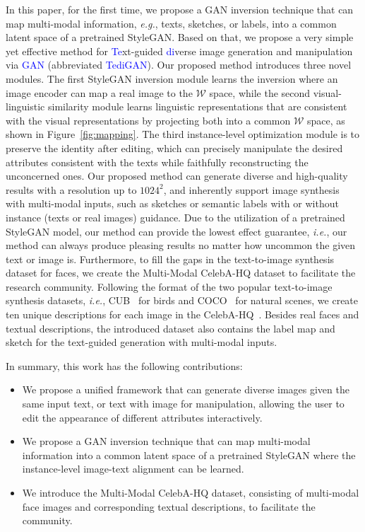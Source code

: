 \documentclass[final]{cvpr}
\newcommand{\W}{\mathcal{W}}
\def\eg{\emph{e.g.}}
\def\ie{\emph{i.e.}}
\begin{document}
In this paper, for the first time, we propose a GAN inversion technique that can map multi-modal information, \eg, texts, sketches, or labels, into a common latent space of a pretrained StyleGAN.
Based on that, we propose a very simple yet effective method for \textcolor{blue}{Te}xt-guided \textcolor{blue}{di}verse image generation and manipulation via \textcolor{blue}{GAN} (abbreviated \textcolor{blue}{TediGAN}). 
Our proposed method introduces three novel modules. The first StyleGAN inversion module learns the inversion where an image encoder can map a real image to the $\W$ space, 
while the second visual-linguistic similarity module learns linguistic representations that are consistent with the visual representations by projecting both into a common $\W$ space, as shown in Figure~\ref{fig:mapping}.
The third instance-level optimization module is to preserve the identity after editing, which can precisely manipulate the desired attributes consistent with the texts while faithfully reconstructing the unconcerned ones.
Our proposed method can generate diverse and high-quality results 
with a resolution up to $\text{1024}^2$,
and inherently support image synthesis with multi-modal inputs, such as sketches or semantic labels with or without instance (texts or real images) guidance.
Due to the utilization of a pretrained StyleGAN model, our method can provide the lowest effect guarantee, \ie, our method can always produce pleasing results no matter how uncommon the given text or image is.
Furthermore, to fill the gaps in the text-to-image synthesis dataset for faces, we create the Multi-Modal CelebA-HQ dataset to facilitate the research community.
Following the format of the two popular text-to-image synthesis datasets, \ie, CUB~\cite{wah2011caltech} for birds and COCO~\cite{lin2014microsoft} for natural scenes, we create ten unique descriptions for each image in the CelebA-HQ~\cite{karras2017progressive}. 
Besides real faces and textual descriptions, the introduced dataset also contains the label map and sketch for the text-guided generation with multi-modal inputs.

In summary, this work has the following contributions:
\begin{itemize} 
\item 
We propose a unified framework that can generate diverse images given the same input text, or text with image for manipulation, allowing the user to edit the appearance of different attributes interactively.

\item We propose a GAN inversion technique that can map multi-modal information into a common latent space of a pretrained StyleGAN where the instance-level image-text alignment can be learned.
\item We introduce the Multi-Modal CelebA-HQ dataset, consisting of multi-modal face images and corresponding textual descriptions, to facilitate the community.
\end{itemize}
\end{document}
